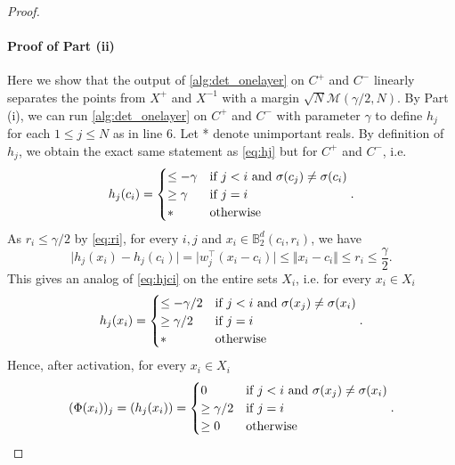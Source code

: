 \documentclass[aoap]{imsart}
\numberwithin{equation}{section}
\theoremstyle{definition}
\theoremstyle{remark}
\numberwithin{equation}{section}
\newcommand{\0}{\mathbf{0}}
\newcommand{\1}{\mathbf{1}}
\newcommand{\B}{\mathbb{B}}
\let \Re \relax
\DeclareMathOperator{\Re}{ReLU}
\numberwithin{equation}{section}
\begin{document}
\begin{proof}
\paragraph{Proof of Part (ii)}
Here we show that the output of \cref{alg:det_onelayer} on $C^{+}$ and $C^{-}$ linearly separates the points from $X^{+}$ and $X^{-1}$ with a margin $\sqrt{N}\mathcal{M}(\gamma/2, N)$. By Part (i), we can run \cref{alg:det_onelayer} on $C^+$ and $C^-$ with parameter $\gamma$ to define $h_j$ for each $1\leq j\leq N$ as in line 6. Let * denote unimportant reals. By definition of $h_j$, we obtain the exact same statement as \eqref{eq:hj} but for $C^+$ and $C^-$, i.e.
\begin{equation}\label{eq:hjci}
h_{j}(c_{i})=\begin{cases}
\leq -\gamma & \textup{if $j<i$ and $\sigma(c_j) \neq \sigma(c_i) $}\\
\geq \gamma  & \textup{if $j=i$}\\
* & \textup{otherwise}
\end{cases}.
\end{equation}
As $r_i\leq \gamma/2$ by \eqref{eq:ri}, for every $i, j$ and $x_{i}\in \B_2^d(c_{i}, r_{i})$, we have 
\[ 
    \vert h_{j}(x_{i})-h_{j}(c_{i})\vert =\vert w_{j}^{\intercal}(x_{i}-c_{i})\vert\leq \Vert x_{i}-c_{i}\Vert\leq r_{i}\leq \frac{\gamma}{2}.
\]
This gives an analog of \eqref{eq:hjci} on the entire sets $X_i$, i.e. for every $x_i\in X_i$
\begin{equation}\label{eq:hjxi}
h_{j}(x_{i})=\begin{cases}
\leq -\gamma/2 & \textup{if $j<i$ and $\sigma(x_j) \neq \sigma(x_i) $}\\
\geq \gamma/2  & \textup{if $j=i$}\\
* & \textup{otherwise}
\end{cases}.
\end{equation}
Hence, after activation, for every $x_i\in X_i$
\begin{equation}\label{eq:phi}
(\Phi(x_i))_j=\Re(h_{j}(x_{i}))=\begin{cases}
0  & \textup{if $j<i$ and $\sigma(x_j) \neq \sigma(x_i) $}\\
\geq \gamma/2  & \textup{if $j=i$}\\
\geq 0 & \textup{otherwise}
\end{cases}.
\end{equation}


\end{proof}
\end{document}
